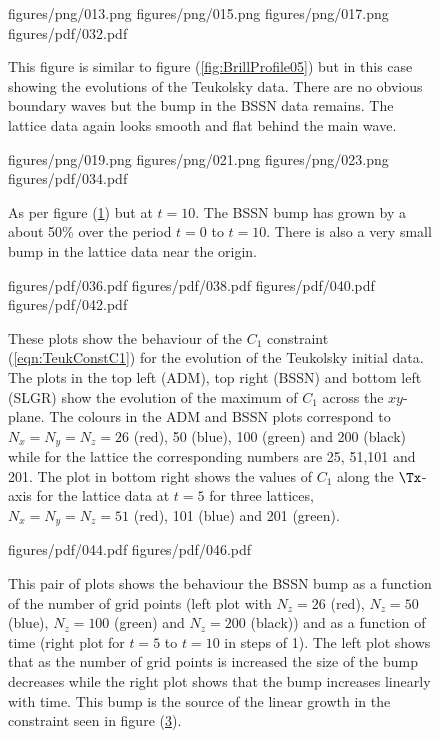 \documentclass[a4paper,12pt]{article}
\numberwithin{equation}{section}
\begin{document}
\newpage

\begin{figure}[!ht]
\FigPair%
{figures/png/013.png}{\mywd}%
{figures/png/015.png}{\mywd}%
\FigPair%
{figures/png/017.png}{\mywd}%
{figures/pdf/032.pdf}{\mywd}%
\caption{This figure is similar to figure (\ref{fig:BrillProfile05}) but in
this case showing the evolutions of the Teukolsky data. There are no obvious
boundary waves but the bump in the BSSN data remains. The lattice data again
looks smooth and flat behind the main wave.}
\label{fig:TeukProfile05}
\end{figure}

\begin{figure}[!ht]
\FigPair%
{figures/png/019.png}{\mywd}%
{figures/png/021.png}{\mywd}%
\FigPair%
{figures/png/023.png}{\mywd}%
{figures/pdf/034.pdf}{\mywd}%
\caption{As per figure (\ref{fig:TeukProfile05}) but at $t=10$. The BSSN bump
has grown by a about 50\% over the period $t=0$ to $t=10$. There is also a
very small bump in the lattice data near the origin.}
\label{fig:TeukProfile10}
\end{figure}

\begin{figure}[!ht]
\FigQuad%
{figures/pdf/036.pdf}{\mywd}%
{figures/pdf/038.pdf}{\mywd}%
{figures/pdf/040.pdf}{\mywd}%
{figures/pdf/042.pdf}{\mywd}%
\caption{These plots show the behaviour of the $C_1$ constraint
(\ref{eqn:TeukConstC1}) for the evolution of the Teukolsky initial data. The
plots in the top left (ADM), top right (BSSN) and bottom left (SLGR) show the
evolution of the maximum of $C_1$ across the $xy$-plane. The colours in the
ADM and BSSN plots correspond to $N_x=N_y=N_z=26$ (red), 50 (blue), 100
(green) and 200 (black) while for the lattice the corresponding numbers are
25, 51,101 and 201. The plot in bottom right shows the values of $C_1$ along
the $\Tx$-axis for the lattice data at $t=5$ for three lattices,
$N_x=N_y=N_z=51$ (red), 101 (blue) and 201 (green).}
\label{fig:TeukConstC1}
\end{figure}

\begin{figure}[!ht]
\FigPair%
{figures/pdf/044.pdf}{\mywd}%
{figures/pdf/046.pdf}{\mywd}%
\caption{This pair of plots shows the behaviour the BSSN bump as a function of
the number of grid points (left plot with $N_z=26$ (red), $N_z=50$ (blue),
$N_z=100$ (green) and $N_z=200$ (black)) and as a function of time (right plot
for $t=5$ to $t=10$ in steps of 1). The left plot shows that as the number of
grid points is increased the size of the bump decreases while the right plot
shows that the bump increases linearly with time. This bump is the source of
the linear growth in the constraint seen in figure (\ref{fig:TeukConstC1}).}
\label{fig:TeukBump}
\end{figure}
\end{document}
